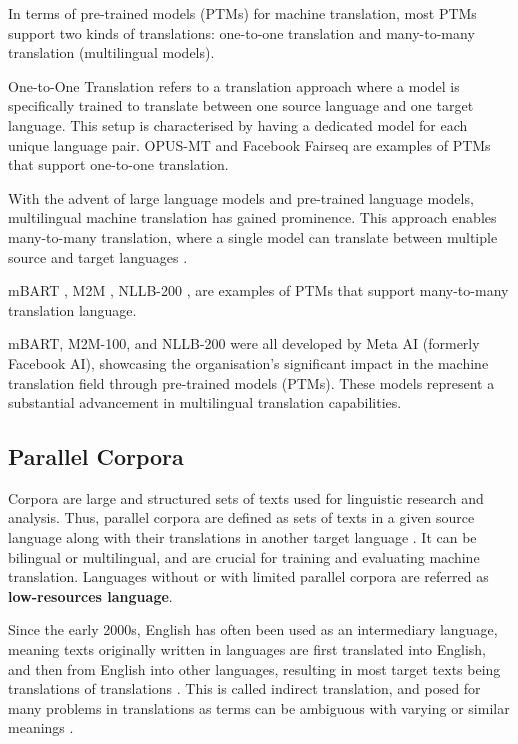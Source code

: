 \documentclass[a4paper]{article}
\begin{document}
In terms of pre-trained models (PTMs) for machine translation, most PTMs support two kinds of translations: one-to-one translation and many-to-many translation (multilingual models).

One-to-One Translation refers to a translation approach where a model is specifically trained to translate between one source language and one target language. This setup is characterised by having a dedicated model for each unique language pair. OPUS-MT \cite{tiedemann-2020-opus-mt} and Facebook Fairseq \cite{ott-2019-fairseq} are examples of PTMs that support one-to-one translation.

With the advent of large language models and pre-trained language models, multilingual machine translation has gained prominence. This approach enables many-to-many translation, where a single model can translate between multiple source and target languages \cite{aharoni-2019-massively-multilingual}.

mBART \cite{liu-2020-mbart}, M2M \cite{fan-2020-m2m100}, NLLB-200 \cite{nllb200-2020}, are examples of PTMs that support many-to-many translation language.

mBART, M2M-100, and NLLB-200 were all developed by Meta AI (formerly Facebook AI), showcasing the organisation's significant impact in the machine translation field through pre-trained models (PTMs). These models represent a substantial advancement in multilingual translation capabilities.


\subsection{Parallel Corpora}

Corpora are large and structured sets of texts used for linguistic research and analysis. Thus, parallel corpora are defined as sets of texts in a given source language along with their translations in another target language \cite{lefer-2020-parallel-corpora}. It can be bilingual or multilingual, and are crucial for training and evaluating machine translation. Languages without or with limited parallel corpora are referred as \textbf{low-resources language}.

Since the early 2000s, English has often been used as an intermediary language, meaning texts originally written in languages are first translated into English, and then from English into other languages, resulting in most target texts being translations of translations \cite{lefer-2020-parallel-corpora}. This is called indirect translation, and posed for many problems in translations as terms can be ambiguous with varying or similar meanings \cite{rosa-2017-indirect-translation-problems}.
\end{document}
